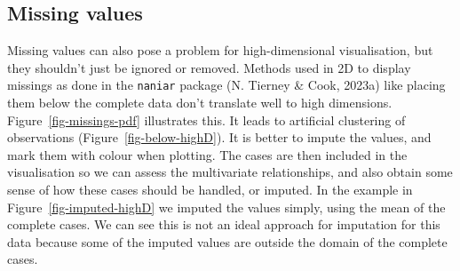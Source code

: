 \documentclass[
  letterpaper,
]{krantz}
\begin{document}
\subsection{Missing values}\label{missing-values}

Missing values can also pose a problem for high-dimensional
visualisation, but they shouldn't just be ignored or removed. Methods
used in 2D to display missings as done in the \texttt{naniar} package
(N. Tierney \& Cook, 2023a) like placing them below the complete data
don't translate well to high dimensions. Figure~\ref{fig-missings-pdf}
illustrates this. It leads to artificial clustering of observations
(Figure~\ref{fig-below-highD}). It is better to impute the values, and
mark them with colour when plotting. The cases are then included in the
visualisation so we can assess the multivariate relationships, and also
obtain some sense of how these cases should be handled, or imputed. In
the example in Figure~\ref{fig-imputed-highD} we imputed the values
simply, using the mean of the complete cases. We can see this is not an
ideal approach for imputation for this data because some of the imputed
values are outside the domain of the complete cases.
\end{document}
